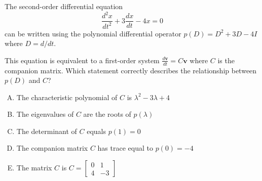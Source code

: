 \documentclass[12pt]{amsart}
\begin{document}
The second-order differential equation
$$\frac{d^2x}{dt^2} + 3\frac{dx}{dt} - 4x = 0$$
can be written using the polynomial differential operator $p(D) = D^2 + 3D - 4I$ where $D = d/dt$.

This equation is equivalent to a first-order system $\frac{d\mathbf{v}}{dt} = C\mathbf{v}$ where $C$ is the companion matrix. Which statement correctly describes the relationship between $p(D)$ and $C$?

\begin{enumerate}[(A)]
\item The characteristic polynomial of $C$ is $\lambda^2 - 3\lambda + 4$
\item The eigenvalues of $C$ are the roots of $p(\lambda)$
\item The determinant of $C$ equals $p(1)=0$
\item The companion matrix $C$ has trace equal to $p(0)=-4$
\item The matrix $C$ is $C = \begin{bmatrix} 0 & 1 \\ 4 & -3 \end{bmatrix}$
\end{enumerate}

\end{document}
